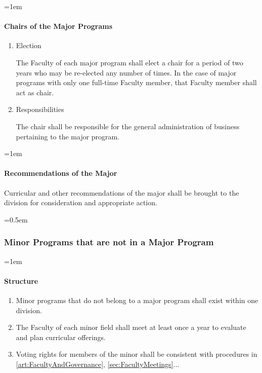 \documentclass{manual}
\let\oldsubsubsection\subsubsection
\renewcommand\subsubsection{\leftskip=0.5em\oldsubsubsection}
\let\oldparagraph\paragraph
\renewcommand\paragraph{\leftskip=1em\oldparagraph}
\newcommand{\itemLevelA}{\alph*.}
\newcommand{\itemRefA}{\alph*}
\begin{document}
\paragraph{Chairs of the Major Programs}
\begin{enumerate}[label=\itemLevelA,ref=\itemRefA]

\item Election

The Faculty of each major program shall elect a chair for a period of two years who may be re-elected any number of times. In the case of major programs with only one full-time Faculty member, that Faculty member shall act as chair.

\item Responsibilities

The chair shall be responsible for the general administration of business pertaining to the major program.
\end{enumerate}


\paragraph{Recommendations of the Major}

Curricular and other recommendations of the major shall be brought to the division for consideration and appropriate action.


\subsubsection{Minor Programs that are not in a Major Program}

\paragraph{Structure}
\begin{enumerate}[label=\itemLevelA,ref=\itemRefA]

\item Minor programs that do not belong to a major program shall exist within one division.


\item The Faculty of each minor field shall meet at least once a year to evaluate and plan curricular offerings. 

\item Voting rights for members of the minor shall be consistent with procedures in \cref{art:FacultyAndGovernance}, \cref{sec:FacultyMeetings}...
\end{enumerate}
\end{document}
